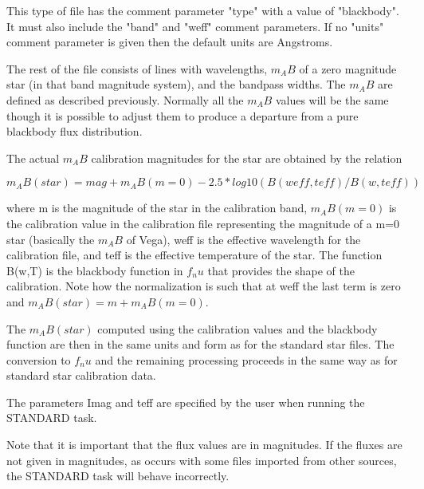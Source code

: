 This type of file has the comment parameter "type" with a value of
"blackbody". It must also include the "band" and "weff" comment
parameters. If no "units" comment parameter is given then the default
units are Angstroms.

The rest of the file consists of lines with wavelengths, $m_AB$ of a
zero magnitude star (in that band magnitude system), and the bandpass
widths. The $m_AB$ are defined as described previously. Normally all the
$m_AB$ values will be the same though it is possible to adjust them to
produce a departure from a pure blackbody flux distribution.

The actual $m_AB$ calibration magnitudes for the star are obtained by the relation

$m_AB(star) = mag + m_AB(m=0) - 2.5 * log10 (B(weff,teff)/B(w,teff))$

where m is the magnitude of the star in the calibration band,
$m_AB(m=0)$ is the calibration value in the calibration file
representing the magnitude of a m=0 star (basically the $m_AB$ of Vega),
weff is the effective wavelength for the calibration file, and teff is
the effective temperature of the star. The function B(w,T) is the
blackbody function in $f_nu$ that provides the shape of the
calibration. Note how the normalization is such that at weff the last
term is zero and $m_AB(star) = m + m_AB(m=0)$.

The $m_AB(star)$ computed using the calibration values and the blackbody
function are then in the same units and form as for the standard star
files. The conversion to $f_nu$ and the remaining processing proceeds in
the same way as for standard star calibration data.

The parameters Imag and teff are specified by the user when running the STANDARD task.

Note that it is important that the flux values are in magnitudes. If
the fluxes are not given in magnitudes, as occurs with some files
imported from other sources, the STANDARD task will behave
incorrectly.


